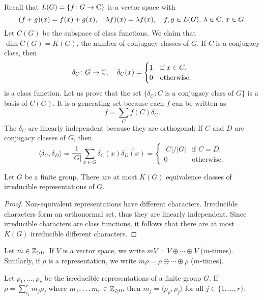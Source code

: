 
Recall that $L(G)=\{f\colon G\to\mathbb{C}\}$ is a vector space with
\[
    (f+g)(x)=f(x)+g(x),
    \quad
    \lambda f)(x)=\lambda f(x),
    \quad 
    f,g\in L(G),\,\lambda\in\mathbb{C},\,x\in G.
\]
Let $C(G)$ be the subspace of class functions. 
We claim that $\dim C(G)=K(G)$, the number of conjugacy classes of $G$. If $C$ is a conjugacy class, 
then 
\[
\delta_C\colon G\to\mathbb{C},\quad
\delta_C(x)=\begin{cases}
    1 & \text{if $x\in C$,}\\
    0 & \text{otherwise.}
\end{cases}
\]
is a class function. Let us prove that the 
set $\{\delta_C:C\text{ is a conjugacy class of $G$}\}$ is a basis of $C(G)$.  It is a generating set
because each $f$ can be written as 
\[
f=\sum_{C}f(C)\delta_C.
\]
The $\delta_C$ are linearly independent because they are orthogonal: 
If $C$ and $D$ 
are conjugacy classes of $G$, then 
\[
\langle\delta_C,\delta_D\rangle=\frac{1}{|G|}\sum_{x\in G}\delta_C(x)\overline{\delta_D(x)}
=\begin{cases}
|C|/|G| & \text{if $C=D$},\\
0 & \text{otherwise}.
\end{cases}
\]

\begin{corollary}
    Let $G$ be a finite group. There are at most $K(G)$ equivalence classes of irreducible representations of $G$.
\end{corollary}

\begin{proof}
    Non-equivalent representations have different characters. 
    Irreducible characters 
    form an orthonormal set, thus they are linearly 
    independent. Since irreducible characters
    are class functions, it follows that there are at most $K(G)$ irreducible different characters.  
\end{proof}

Let $m\in\mathbb{Z}_{>0}$. If $V$ is a vector space, we 
write $mV=V\oplus\cdots\oplus V$ ($m$-times). Similarly,
if $\rho$ is a representation, 
we write $m\rho=\rho\oplus\cdots\oplus\rho$ ($m$-times). 


\begin{theorem}
    Let $\rho_1,\dots,\rho_r$ be the irreducible representations of a finite group $G$. If 
	$\rho=\sum_{i_1}^rm_j\rho_j$ where $m_1,\dots m_r\in\mathbb{Z}_{\geq0}$, then
    $m_j=\langle \rho_\rho,\rho_j\rangle$ for all $j\in\{1,\dots,r\}$. 
\end{theorem}

